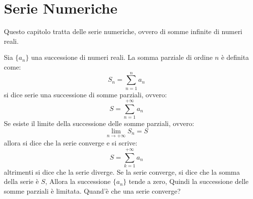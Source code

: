 \section{Serie Numeriche}
    Questo capitolo tratta delle serie numeriche, ovvero di somme infinite di numeri reali.
    
    
    \begin{definizione}
        
    Sia $\{a_n\}$ una successione di numeri reali. La somma parziale di ordine $n$ è definita come:
    \[
    S_n = \sum_{n=1}^n a_n
    \] si dice serie una successione di somme parziali, ovvero:
    \[ S = \sum_{n=1}^{+\infty} a_n \]
    Se esiste il limite della successione delle somme parziali, ovvero: \[ \lim_{n \to +\infty} S_n = S \] allora si dice che la serie converge e si scrive: \[ S = \sum_{k=1}^{+\infty} a_n \] altrimenti si dice che la serie diverge.
    Se la serie converge, si dice che la somma della serie è $S$, 
    Allora la successione $\{a_n\}$ tende a zero,
    Quindi la successione delle somme parziali è limitata.
    Quand'è che una serie converge?
    \end{definizione}
